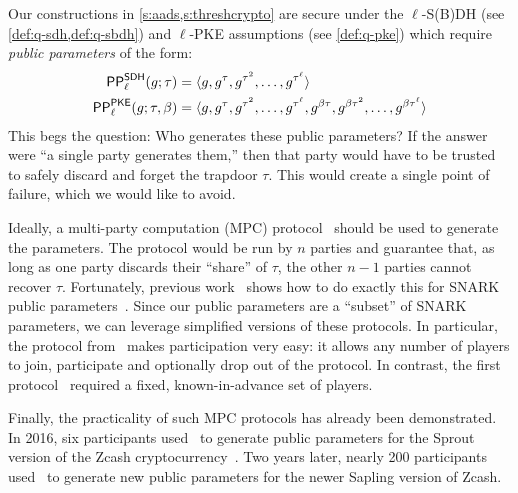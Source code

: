 Our constructions in \cref{s:aads,s:threshcrypto} are secure under the $\ell$-S(B)DH (see \cref{def:q-sdh,def:q-sbdh}) and $\ell$-PKE assumptions (see \cref{def:q-pke}) which require \textit{public parameters} of the form:
\begin{align*}
\mathsf{PP}^\mathsf{SDH}_\ell(g; \tau)        &= \langle g,g^\tau, g^{\tau^2},\dots,g^{\tau^\ell} \rangle\\
\mathsf{PP}^\mathsf{PKE}_\ell(g; \tau,\beta)  &= \langle g,g^\tau, g^{\tau^2},\dots,g^{\tau^\ell},g^{\beta\tau}, g^{\beta\tau^2},\dots,g^{\beta\tau^\ell}\rangle
\end{align*}
This begs the question: Who generates these public parameters?
If the answer were ``a single party generates them,'' then that party would have to be trusted to safely discard and forget the trapdoor $\tau$.
This would create a single point of failure, which we would like to avoid.

Ideally, a multi-party computation (MPC) protocol~\cite{GMW87} should be used to generate the parameters.
The protocol would be run by $n$ parties and guarantee that, as long as one party discards their ``share'' of $\tau$, the other $n-1$ parties cannot recover $\tau$.
Fortunately, previous work~\cite{zcash-mpc1,zcash-mpc2} shows how to do exactly this for SNARK public parameters~\cite{groth10,groth16}.
Since our public parameters are a ``subset'' of SNARK parameters, we can leverage simplified versions of these protocols.
In particular, the protocol from~\cite{zcash-mpc2} makes participation very easy: it allows any number of players to join, participate and optionally drop out of the protocol.
In contrast, the first protocol~\cite{zcash-mpc1} required a fixed, known-in-advance set of players.

Finally, the practicality of such MPC protocols has already been demonstrated.
In 2016, six participants used~\cite{zcash-mpc1} to generate public parameters for the Sprout version of the Zcash cryptocurrency~\cite{zcash}.
Two years later, nearly 200 participants used~\cite{zcash-mpc2} to generate new public parameters for the newer Sapling version of Zcash.